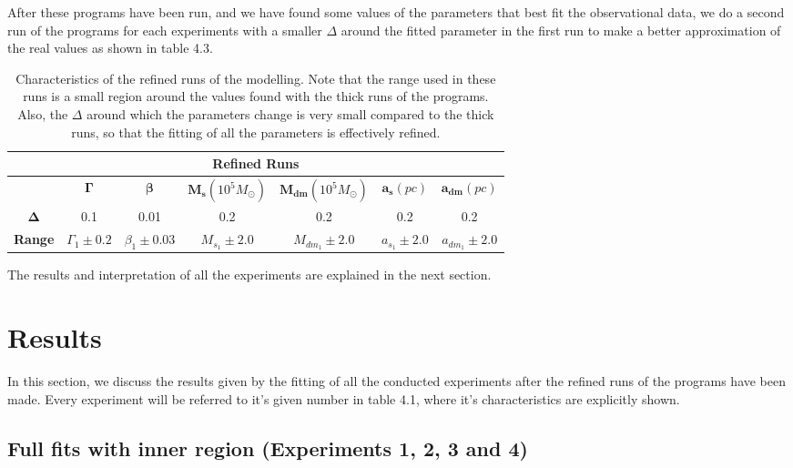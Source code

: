 After these programs have been run, and we have found some values of the parameters that best fit the observational data, we do a second run of the programs for each experiments with a smaller $\Delta$ around the fitted parameter in the first run to make a better approximation of the real values as shown in table 4.3.

\begin{table}[H]
\centering
\label{my-label}
\begin{tabular}{|c|c|c|c|c|c|c|}
\hline
\multicolumn{7}{|c|}{\textbf{Refined Runs}}                                                                          \\ \hline
               & \textbf{$\mathbf{\Gamma}$} & \textbf{$\mathbf{\beta}$} & \textbf{$\mathbf{M_{s}}(10^{5} M_{\odot})$} & \textbf{$\mathbf{M_{dm}}(10^{5} M_{\odot})$} & \textbf{$\mathbf{a_{s}}(pc)$} & \textbf{$\mathbf{a_{dm}}(pc)$} \\ \hline
\textbf{$\mathbf{\Delta}$}  &  0.1 &  0.01     &  0.2    &  0.2   &  0.2    &  0.2          \\ \hline
\textbf{Range} & $\Gamma_{1}\pm 0.2$   & $\beta_{1}\pm 0.03$        & $M_{s}_{1}\pm 2.0$      & $M_{dm}_{1}\pm 2.0$   & $a_{s}_{1}\pm 2.0$      & $a_{dm}_{1}\pm 2.0$            \\ \hline
\end{tabular}
\caption[Characteristics of the refined runs of the modelling]{Characteristics of the refined runs of the modelling. Note that the range used in these runs is a small region around the values found with the thick runs of the programs. Also, the $\Delta$ around which the parameters change is very small compared to the thick runs, so that the fitting of all the parameters is effectively refined.}
\end{table}

The results and interpretation of all the experiments are explained in the next section.

\section{Results}

In this section, we discuss the results given by the fitting of all the conducted experiments after the refined runs of the programs have been made. Every experiment will be referred to it's given number in table 4.1, where it's characteristics are explicitly shown.

\subsection{Full fits with inner region (Experiments 1, 2, 3 and 4)}

